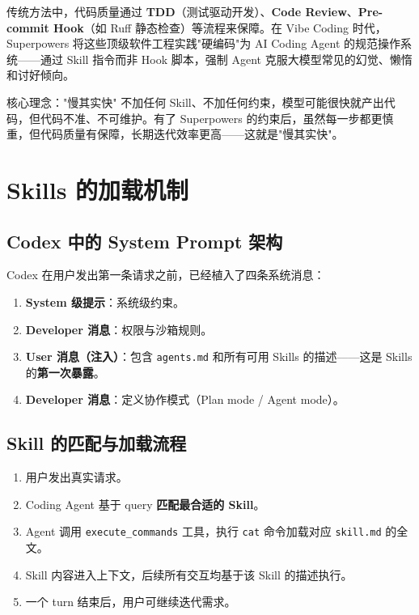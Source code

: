 \documentclass[a4paper]{article}
\begin{document}
传统方法中，代码质量通过 \textbf{TDD}（测试驱动开发）、\textbf{Code Review}、\textbf{Pre-commit Hook}（如 Ruff 静态检查）等流程来保障。在 Vibe Coding 时代，Superpowers 将这些顶级软件工程实践"硬编码"为 AI Coding Agent 的规范操作系统——通过 Skill 指令而非 Hook 脚本，强制 Agent 克服大模型常见的幻觉、懒惰和讨好倾向。

\begin{importantbox}{核心理念："慢其实快"}
不加任何 Skill、不加任何约束，模型可能很快就产出代码，但代码不准、不可维护。有了 Superpowers 的约束后，虽然每一步都更慎重，但代码质量有保障，长期迭代效率更高——这就是"慢其实快"。
\end{importantbox}


\section{Skills 的加载机制}

\subsection{Codex 中的 System Prompt 架构}

Codex 在用户发出第一条请求之前，已经植入了四条系统消息：

\begin{enumerate}
    \item \textbf{System 级提示}：系统级约束。
    \item \textbf{Developer 消息}：权限与沙箱规则。
    \item \textbf{User 消息（注入）}：包含 \texttt{agents.md} 和所有可用 Skills 的描述——这是 Skills 的\textbf{第一次暴露}。
    \item \textbf{Developer 消息}：定义协作模式（Plan mode / Agent mode）。
\end{enumerate}

\subsection{Skill 的匹配与加载流程}

\begin{enumerate}
    \item 用户发出真实请求。
    \item Coding Agent 基于 query \textbf{匹配最合适的 Skill}。
    \item Agent 调用 \texttt{execute\_commands} 工具，执行 \texttt{cat} 命令加载对应 \texttt{skill.md} 的全文。
    \item Skill 内容进入上下文，后续所有交互均基于该 Skill 的描述执行。
    \item 一个 turn 结束后，用户可继续迭代需求。
\end{enumerate}
\end{document}
